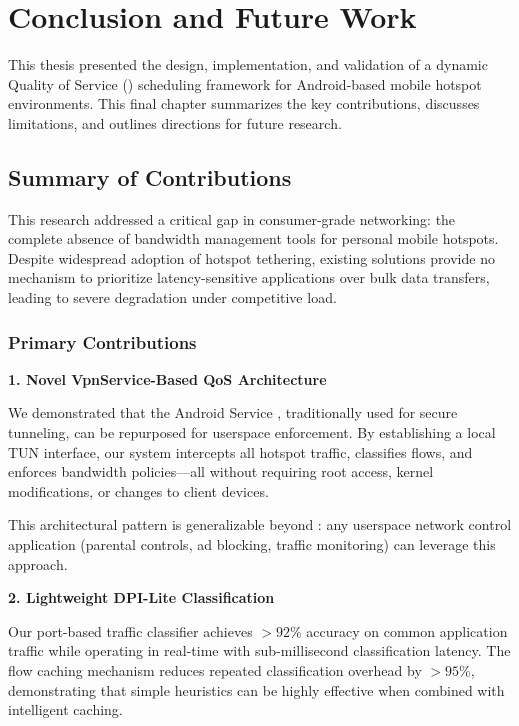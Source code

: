 \chapter{Conclusion and Future Work}
\label{ch:conclusion}

This thesis presented the design, implementation, and validation of a dynamic Quality of Service (\qos) scheduling framework for Android-based mobile hotspot environments. This final chapter summarizes the key contributions, discusses limitations, and outlines directions for future research.

\section{Summary of Contributions}
\label{sec:summary-contributions}

This research addressed a critical gap in consumer-grade networking: the complete absence of bandwidth management tools for personal mobile hotspots. Despite widespread adoption of hotspot tethering, existing solutions provide no mechanism to prioritize latency-sensitive applications over bulk data transfers, leading to severe \qos degradation under competitive load.

\subsection{Primary Contributions}

\textbf{1. Novel VpnService-Based QoS Architecture}

We demonstrated that the Android \vpn Service \api, traditionally used for secure tunneling, can be repurposed for userspace \qos enforcement. By establishing a local TUN interface, our system intercepts all hotspot traffic, classifies flows, and enforces bandwidth policies—all without requiring root access, kernel modifications, or changes to client devices.

This architectural pattern is generalizable beyond \qos: any userspace network control application (parental controls, ad blocking, traffic monitoring) can leverage this approach.

\textbf{2. Lightweight DPI-Lite Classification}

Our port-based traffic classifier achieves $>92\%$ accuracy on common application traffic while operating in real-time with sub-millisecond classification latency. The flow caching mechanism reduces repeated classification overhead by $>95\%$, demonstrating that simple heuristics can be highly effective when combined with intelligent caching.

